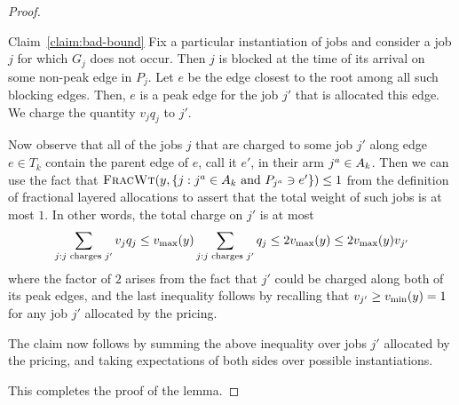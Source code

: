 \begin{proof}
\begin{proofof}{Claim~\ref{claim:bad-bound}}
  Fix a particular instantiation of jobs and consider a job $j$ for
  which $G_j$ does not occur. Then $j$ is blocked at the time of its
  arrival on some non-peak edge in $P_j$. Let $e$ be the edge closest
  to the root among all such blocking edges. Then, $e$ is a peak edge
  for the job $j'$ that is allocated this edge. We charge the quantity
  $v_jq_j$ to $j'$.

  Now observe that all of the jobs $j$ that are charged to some job
  $j'$ along edge $e\in T_k$ contain the parent edge of $e$, call it $e'$, in their
  arm ${{j}^a}\in A_k$. Then we can use the fact that
  ${\normalfont\textsc{FracWt}}(y, \{j: {{j}^a}\in A_k \text{ and } P_{{{j}^a}}\ni e'\}) \le 1$ from the
  definition of fractional layered allocations to assert that the
  total weight of such jobs is at most $1$. In other words, the total
  charge on $j'$ is at most 
  \[\sum_{j: j\text{ charges }j'} v_j q_j \le v_{\max}(y) \sum_{j: j\text{ charges }j'} q_j \le 2v_{\max}(y) \le 2v_{\max}(y) v_{j'}\]
  where the factor of $2$ arises from the fact that $j'$ could be
  charged along both of its peak edges, and the last inequality follows
  by recalling that $v_{j'}\ge v_{\min}(y)=1$ for any job $j'$ allocated
  by the pricing.

  The claim now follows by summing the above inequality over jobs $j'$
  allocated by the pricing, and taking expectations of both sides over
  possible instantiations.
\end{proofof}
This completes the proof of the lemma.
  \end{proof}





